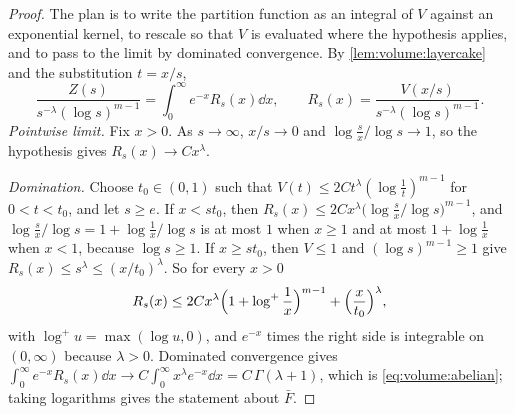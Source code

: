 \begin{refsection}

\begin{proof}
The plan is to write the partition function as an integral of $V$ against an exponential kernel, to rescale so that $V$ is evaluated where the hypothesis applies, and to pass to the limit by dominated convergence. By \cref{lem:volume:layercake} and the substitution $t=x/s$,
\[
\frac{Z(s)}{s^{-\lambda}(\log s)^{m-1}}=\int_0^\infty e^{-x}R_s(x)\dd x,\qquad R_s(x)=\frac{V(x/s)}{s^{-\lambda}(\log s)^{m-1}}.
\]
\emph{Pointwise limit.} Fix $x>0$. As $s\to\infty$, $x/s\to0$ and $\log\frac sx/\log s\to1$, so the hypothesis gives $R_s(x)\to Cx^\lambda$.

\emph{Domination.} Choose $t_0\in(0,1)$ such that $V(t)\le2Ct^\lambda(\log\frac1t)^{m-1}$ for $0<t<t_0$, and let $s\ge e$. If $x<st_0$, then $R_s(x)\le2Cx^\lambda\bigl(\log\frac sx/\log s\bigr)^{m-1}$, and $\log\frac sx/\log s=1+\log\frac1x/\log s$ is at most $1$ when $x\ge1$ and at most $1+\log\frac1x$ when $x<1$, because $\log s\ge1$. If $x\ge st_0$, then $V\le1$ and $(\log s)^{m-1}\ge1$ give $R_s(x)\le s^\lambda\le(x/t_0)^\lambda$. So for every $x>0$
\[
R_s(x)\le2Cx^\lambda\Bigl(1+\log^+\frac1x\Bigr)^{m-1}+\Bigl(\frac x{t_0}\Bigr)^\lambda,
\]
with $\log^+u=\max(\log u,0)$, and $e^{-x}$ times the right side is integrable on $(0,\infty)$ because $\lambda>0$. Dominated convergence gives $\int_0^\infty e^{-x}R_s(x)\dd x\to C\int_0^\infty x^\lambda e^{-x}\dd x=C\,\Gamma(\lambda+1)$, which is \eqref{eq:volume:abelian}; taking logarithms gives the statement about $\bar F$.
\end{proof}


\end{refsection}
